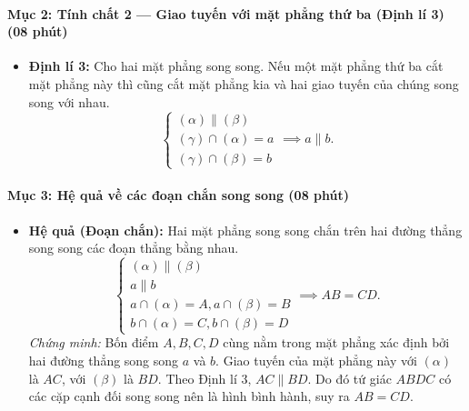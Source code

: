 \documentclass[12pt, a4paper]{article}
\begin{document}
\paragraph{Mục 2: Tính chất 2 --- Giao tuyến với mặt phẳng thứ ba (Định lí 3) (08 phút)}
\begin{itemize}
    \item \textbf{Định lí 3:} Cho hai mặt phẳng song song. Nếu một mặt phẳng thứ ba cắt mặt phẳng này thì cũng cắt mặt phẳng kia và hai giao tuyến của chúng song song với nhau.
    $$\begin{cases} (\alpha) \parallel (\beta) \\ (\gamma) \cap (\alpha) = a \\ (\gamma) \cap (\beta) = b \end{cases} \implies a \parallel b.$$
\end{itemize}

\begin{center}
\end{center}

\paragraph{Mục 3: Hệ quả về các đoạn chắn song song (08 phút)}
\begin{itemize}
    \item \textbf{Hệ quả (Đoạn chắn):} Hai mặt phẳng song song chắn trên hai đường thẳng song song các đoạn thẳng bằng nhau.
    $$\begin{cases} (\alpha) \parallel (\beta) \\ a \parallel b \\ a \cap (\alpha) = A, a \cap (\beta) = B \\ b \cap (\alpha) = C, b \cap (\beta) = D \end{cases} \implies AB = CD.$$
    \textit{Chứng minh:} Bốn điểm $A, B, C, D$ cùng nằm trong mặt phẳng xác định bởi hai đường thẳng song song $a$ và $b$. Giao tuyến của mặt phẳng này với $(\alpha)$ là $AC$, với $(\beta)$ là $BD$. Theo Định lí 3, $AC \parallel BD$. Do đó tứ giác $ABDC$ có các cặp cạnh đối song song nên là hình bình hành, suy ra $AB = CD$.
\end{itemize}
\end{document}
